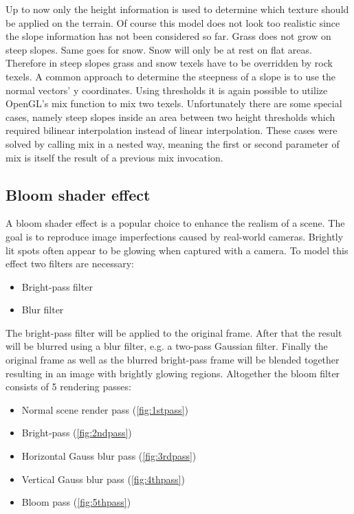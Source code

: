 \documentclass[11pt,a4paper,twoside,openright]{report}
\begin{document}
Up to now only the height information is used to determine which texture should be applied on the terrain. Of course this model does not look too realistic since the slope information has not been considered so far. Grass does not grow on steep slopes. Same goes for snow. Snow will only be at rest on flat areas. Therefore in steep slopes grass and snow texels have to be overridden by rock texels. A common approach to determine the steepness of a slope is to use the normal vectors' y coordinates. Using thresholds it is again possible to utilize OpenGL's mix function to mix two texels. Unfortunately there are some special cases, namely steep slopes inside an area between two height thresholds which required bilinear interpolation instead of linear interpolation. These cases were solved by calling mix in a nested way, meaning the first or second parameter of mix is itself the result of a previous mix invocation.

\subsection{Bloom shader effect}
A bloom shader effect is a popular choice to enhance the realism of a scene. The goal is to reproduce image imperfections caused by real-world cameras. Brightly lit spots often appear to be glowing when captured with a camera. To model this effect two filters are necessary:
\begin{itemize}
\item Bright-pass filter
\item Blur filter
\end{itemize}
The bright-pass filter will be applied to the original frame. After that the result will be blurred using a blur filter, e.g. a two-pass Gaussian filter. Finally the original frame as well as the blurred bright-pass frame will be blended together resulting in an image with brightly glowing regions. Altogether the bloom filter consists of 5 rendering passes:
\begin{itemize}
  \item Normal scene render pass (\cref{fig:1stpass})
  \item Bright-pass (\cref{fig:2ndpass})
  \item Horizontal Gauss blur pass (\cref{fig:3rdpass})
  \item Vertical Gauss blur pass (\cref{fig:4thpass})
  \item Bloom pass (\cref{fig:5thpass})
\end{itemize}
\end{document}
